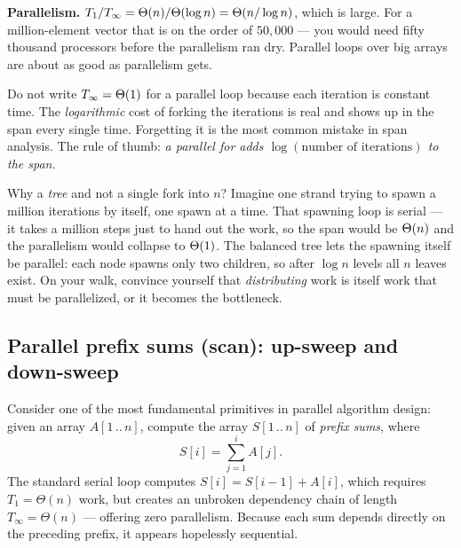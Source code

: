 \textbf{Parallelism.} $T_1/T_\infty = \Theta(n)/\Theta(\log n) = \Theta(n/\log n)$, which is large.
For a million-element vector that is on the order of $50{,}000$ --- you would need
fifty thousand processors before the parallelism ran dry. Parallel loops over big
arrays are about as good as parallelism gets.

\begin{trapbox}
Do not write $T_\infty = \Theta(1)$ for a parallel loop because each iteration
is constant time. The \emph{logarithmic} cost of forking the iterations is real
and shows up in the span every single time. Forgetting it is the most common
mistake in span analysis. The rule of thumb: \emph{a parallel for adds $\log
(\text{number of iterations})$ to the span.}
\end{trapbox}

\begin{walkbox}
Why a \emph{tree} and not a single fork into $n$? Imagine one strand trying to
spawn a million iterations by itself, one spawn at a time. That spawning loop is
serial --- it takes a million steps just to hand out the work, so the span would be
$\Theta(n)$ and the parallelism would collapse to $\Theta(1)$. The balanced tree lets
the spawning itself be parallel: each node spawns only two children, so after
$\log n$ levels all $n$ leaves exist. On your walk, convince yourself that
\emph{distributing} work is itself work that must be parallelized, or it becomes
the bottleneck.
\end{walkbox}

\subsection{Parallel prefix sums (scan): up-sweep and down-sweep}
\label{ch35:prefix-scan}

Consider one of the most fundamental primitives in parallel algorithm design:
given an array $A[1\,..\,n]$, compute the array $S[1\,..\,n]$ of \emph{prefix sums},
where
\[
S[i] = \sum_{j=1}^{i} A[j].
\] The standard serial loop computes
$S[i] = S[i-1] + A[i]$, which requires $T_1 = \Theta(n)$ work, but creates an
unbroken dependency chain of length $T_\infty = \Theta(n)$ --- offering zero
parallelism. Because each sum depends directly on the preceding prefix, it appears
hopelessly sequential.

